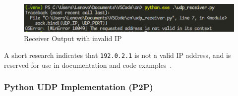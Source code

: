 \begin{figure}[htbp]
	\centering
	\includegraphics[width=1\linewidth]{img/second_exp/5.png}
	\caption{Receiver Output with invalid IP}\label{fig:2_5}
\end{figure}

A short research indicates that \texttt{192.0.2.1} is not a valid IP address,
and is reserved for use in documentation and code examples~\cite{rfc5735}.

\subsubsection{Python UDP Implementation (P2P)}

